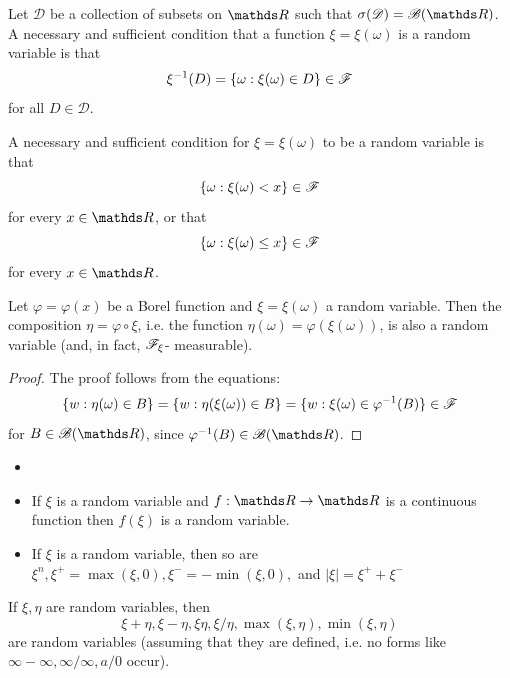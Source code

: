 \begin{lemma}
Let $\mathcal{D}$ be a collection of subsets on $\R$ such that $\sigma(\mathcal{D}) = \B(\R)$. A necessary and sufficient condition that a function $\xi = \xi(\omega)$ is a random variable is that
\begin{equation*}
    \xi^{-1}(D) = \{ \omega: \xi(\omega) \in D \} \in \mathcal{F}
\end{equation*}
for all $D \in \mathcal{D}$.
\end{lemma}
\begin{corollary}
A necessary and sufficient condition for $\xi = \xi(\omega)$ to be a random variable is that
\begin{equation*}
    \{ \omega: \xi(\omega) < x \} \in \mathcal{F}
\end{equation*}
for every $x \in \R$, or that
\begin{equation*}
    \{ \omega: \xi(\omega) \le x \} \in \mathcal{F}
\end{equation*}
for every $x \in \R$.
\end{corollary}
\begin{lemma}
Let $\varphi = \varphi(x)$ be a Borel function and $\xi = \xi(\omega)$ a random variable. Then the composition $\eta = \varphi \circ \xi$, i.e. the function $\eta(\omega) = \varphi(\xi(\omega))$, is also a random variable (and, in fact, $\mathcal{F}_\xi$- measurable).
\end{lemma}
\begin{proof}
The proof follows from the equations:
\begin{equation*}
    \{w:\eta(\omega) \in B \} = \{w:\eta(\xi(\omega)) \in B \} = \{w:\xi(\omega) \in \varphi^{-1}(B)  \} \in \mathcal{F}
\end{equation*}
for $B \in \B(\R)$, since $\varphi^{-1}(B) \in \B(\R)$.
\end{proof}

\begin{example}
\begin{itemize}
    \item[]
    \item If $\xi$ is a random variable and $f: \R \rightarrow \R$ is a continuous function then $f(\xi)$ is a random variable.
    \item If $\xi$ is a random variable, then so are $\xi^n, \xi^+ = \max(\xi,0), \xi^-=-\min(\xi,0),$ and $|\xi| = \xi^+ + \xi^-$
\end{itemize}
\end{example}

\begin{lemma}
If $\xi,\eta$ are random variables, then 
\begin{equation*}
    \xi + \eta, \xi - \eta, \xi \eta, \xi/ \eta, \max{(\xi,\eta)}, \min{(\xi,\eta)}
\end{equation*}
are random variables (assuming that they are defined, i.e. no forms like $\infty - \infty, \infty/\infty,  a/0$ occur).
\end{lemma}

